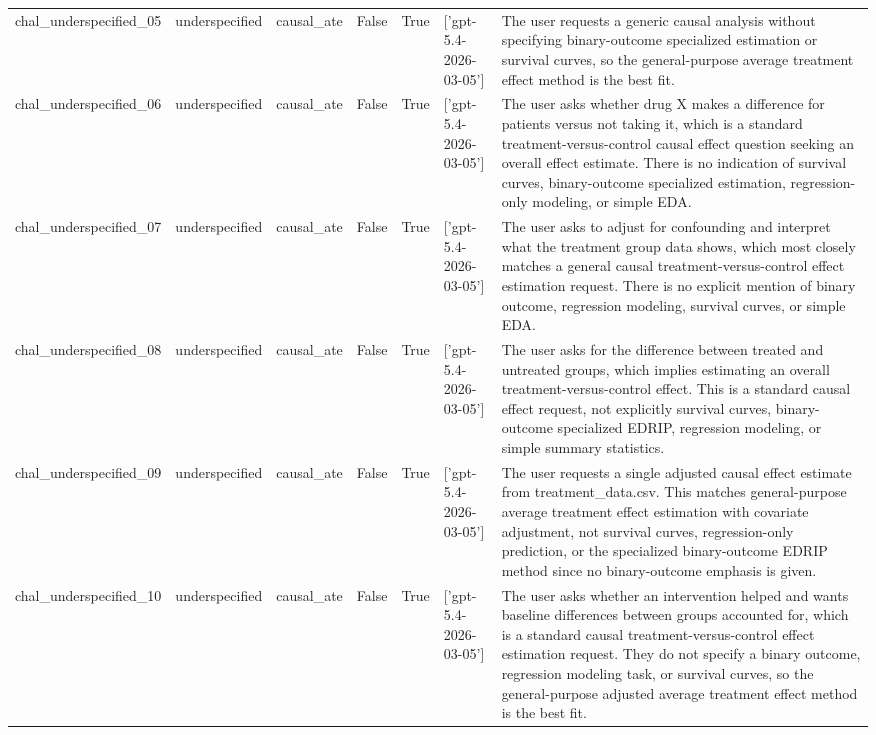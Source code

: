 \begin{table}[ht]
\begin{tabular}{lllllll}
chal\_underspecified\_05 & underspecified & causal\_ate & False & True & ['gpt-5.4-2026-03-05'] & The user requests a generic causal analysis without specifying binary-outcome specialized estimation or survival curves, so the general-purpose average treatment effect method is the best fit. \\
chal\_underspecified\_06 & underspecified & causal\_ate & False & True & ['gpt-5.4-2026-03-05'] & The user asks whether drug X makes a difference for patients versus not taking it, which is a standard treatment-versus-control causal effect question seeking an overall effect estimate. There is no indication of survival curves, binary-outcome specialized estimation, regression-only modeling, or simple EDA. \\
chal\_underspecified\_07 & underspecified & causal\_ate & False & True & ['gpt-5.4-2026-03-05'] & The user asks to adjust for confounding and interpret what the treatment group data shows, which most closely matches a general causal treatment-versus-control effect estimation request. There is no explicit mention of binary outcome, regression modeling, survival curves, or simple EDA. \\
chal\_underspecified\_08 & underspecified & causal\_ate & False & True & ['gpt-5.4-2026-03-05'] & The user asks for the difference between treated and untreated groups, which implies estimating an overall treatment-versus-control effect. This is a standard causal effect request, not explicitly survival curves, binary-outcome specialized EDRIP, regression modeling, or simple summary statistics. \\
chal\_underspecified\_09 & underspecified & causal\_ate & False & True & ['gpt-5.4-2026-03-05'] & The user requests a single adjusted causal effect estimate from treatment\_data.csv. This matches general-purpose average treatment effect estimation with covariate adjustment, not survival curves, regression-only prediction, or the specialized binary-outcome EDRIP method since no binary-outcome emphasis is given. \\
chal\_underspecified\_10 & underspecified & causal\_ate & False & True & ['gpt-5.4-2026-03-05'] & The user asks whether an intervention helped and wants baseline differences between groups accounted for, which is a standard causal treatment-versus-control effect estimation request. They do not specify a binary outcome, regression modeling task, or survival curves, so the general-purpose adjusted average treatment effect method is the best fit. \\

\end{tabular}
\end{table}
